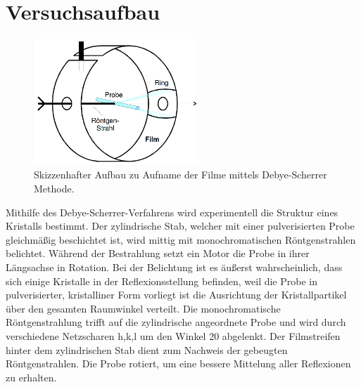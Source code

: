 \section{Versuchsaufbau}
\label{sec:Versuchaufbau}
\begin{figure}
    \centering
    \includegraphics[width=0.55\textwidth]{ressources/aufbau.png}
    \caption{Skizzenhafter Aufbau zu Aufname der Filme mittels Debye-Scherrer Methode\cite{skript}.}
    \label{aufbau}
\end{figure}
Mithilfe des Debye-Scherrer-Verfahrens wird experimentell die Struktur eines Kristalls bestimmt. Der zylindrische Stab, welcher mit einer pulverisierten Probe gleichmäßig beschichtet ist, wird mittig mit monochromatischen Röntgenstrahlen belichtet. Während der Bestrahlung setzt ein Motor die Probe in ihrer Längsachse in Rotation. Bei der Belichtung ist es äußerst wahrscheinlich, dass sich einige Kristalle in der Reflexionsstellung befinden, weil die Probe in pulverisierter, kristalliner Form vorliegt ist die Ausrichtung der Kristallpartikel über den gesamten Raumwinkel verteilt. Die monochromatische Röntgenstrahlung trifft auf die zylindrische angeordnete Probe und wird durch verschiedene Netzscharen {h,k,l} um den Winkel 20 abgelenkt. Der Filmstreifen hinter dem zylindrischen Stab dient zum Nachweis der gebeugten Röntgenstrahlen. Die Probe rotiert, um eine bessere Mittelung aller Reflexionen zu erhalten.
